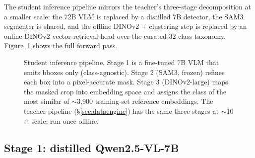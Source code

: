 The student inference pipeline mirrors the teacher's three-stage decomposition
at a smaller scale: the 72B VLM is replaced by a distilled 7B detector, the
SAM3 segmenter is shared, and the offline DINOv2 + clustering step is
replaced by an online DINOv2 vector retrieval head over the curated 32-class
taxonomy. Figure~\ref{fig:pipeline-student} shows the full forward pass.

\begin{figure}[t]
\centering
{}
\caption{Student inference pipeline. Stage 1 is a fine-tuned 7B VLM that
emits bboxes only (class-agnostic). Stage 2 (SAM3, frozen) refines each box
into a pixel-accurate mask. Stage 3 (DINOv2-large) maps the masked crop into
embedding space and assigns the class of the most similar of $\sim$3{,}900
training-set reference embeddings. The teacher pipeline (\S\ref{sec:dataengine})
has the same three stages at $\sim$10$\times$ scale, run once offline.}
\label{fig:pipeline-student}
\end{figure}

\subsection{Stage 1: distilled Qwen2.5-VL-7B}
\label{sec:st:s1}

